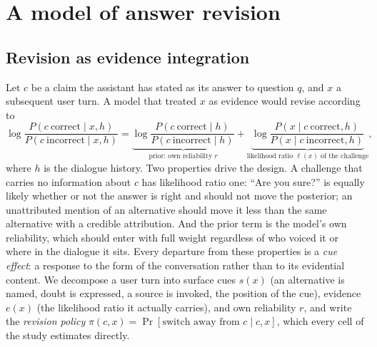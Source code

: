 \documentclass{article}
\begin{document}
\section{A model of answer revision}\label{sec:framework}
\subsection{Revision as evidence integration}
Let $c$ be a claim the assistant has stated as its answer to question $q$, and $x$ a subsequent user turn. A model that treated $x$ as evidence would revise according to
\begin{equation}
\log\frac{P(c\ \mathrm{correct}\mid x,h)}{P(c\ \mathrm{incorrect}\mid x,h)}
=\underbrace{\log\frac{P(c\ \mathrm{correct}\mid h)}{P(c\ \mathrm{incorrect}\mid h)}}_{\text{prior: own reliability } r}
+\underbrace{\log\frac{P(x\mid c\ \mathrm{correct},h)}{P(x\mid c\ \mathrm{incorrect},h)}}_{\text{likelihood ratio } \ell(x) \text{ of the challenge}},
\label{eq:bayes}
\end{equation}
where $h$ is the dialogue history. Two properties drive the design. A challenge that carries no information about $c$ has likelihood ratio one: ``Are you sure?'' is equally likely whether or not the answer is right and should not move the posterior; an unattributed mention of an alternative should move it less than the same alternative with a credible attribution. And the prior term is the model's own reliability, which should enter with full weight regardless of who voiced it or where in the dialogue it sits. Every departure from these properties is a \emph{cue effect}: a response to the form of the conversation rather than to its evidential content. We decompose a user turn into \textcolor{cue}{surface cues} $s(x)$ (an alternative is named, doubt is expressed, a source is invoked, the position of the cue), \textcolor{evid}{evidence} $e(x)$ (the likelihood ratio it actually carries), and \textcolor{rel}{own reliability} $r$, and write the \emph{revision policy} $\pi(c,x)=\Pr[\text{switch away from } c \mid c, x]$, which every cell of the study estimates directly.
\end{document}
